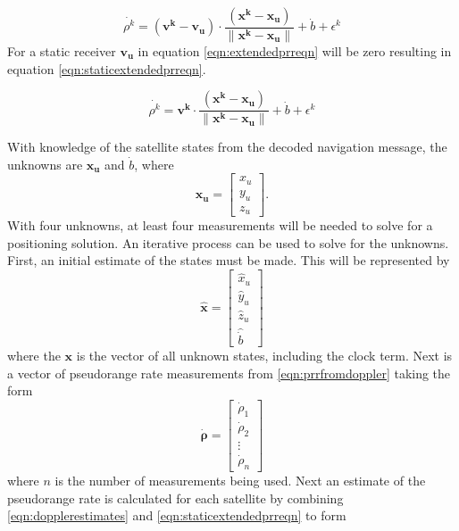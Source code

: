 \documentclass[12pt]{report}
\begin{document}
\begin{equation}
    \dot{\rho^{k}} = (\mathbf{v^{k}} - \mathbf{v_u}) \cdot \frac{(\mathbf{x^k} - \mathbf{x_u})}{\| \mathbf{x^k} - \mathbf{x_u}\|} + \dot{b} + \epsilon^{k}
    \label{eqn:extendedprreqn}
\end{equation}
For a static receiver $\mathbf{v_u}$ in equation \ref{eqn:extendedprreqn} will be zero resulting in equation \ref{eqn:staticextendedprreqn}.

\begin{equation}
    \dot{\rho^{k}} = \mathbf{v^{k}} \cdot \frac{(\mathbf{x^k} - \mathbf{x_u})}{\| \mathbf{x^k} - \mathbf{x_u}\|} + \dot{b} + \epsilon^{k}
    \label{eqn:staticextendedprreqn}
\end{equation}

With knowledge of the satellite states from the decoded navigation message, the unknowns are $\mathbf{x_u}$ and $\dot{b}$, where
\begin{equation}
\mathbf{x_u} = 
\begin{bmatrix}
        x_u\\
        y_u\\
        z_u 
\end{bmatrix}.
\end{equation}
With four unknowns, at least four measurements will be needed to solve for a positioning solution. An iterative process can be used to solve for the unknowns. 
First, an initial estimate of the states must be made. This will be represented by
\begin{equation}
    \mathbf{\hat{x}} = 
    \begin{bmatrix}
        \hat{x}_u\\
        \hat{y}_u\\
        \hat{z}_u\\
        \hat{\dot{b}}
    \end{bmatrix}
    \label{eqn:dopplerestimates}
\end{equation}
where the $\mathbf{x}$ is the vector of all unknown states, including the clock term.
Next is a vector of pseudorange rate measurements from \ref{eqn:prrfromdoppler} taking the form
\begin{equation}
\mathbf{\dot{\rho}} = \begin{bmatrix}
    \dot{\rho}_1 \\
    \dot{\rho}_2 \\
    \vdots\\
    \dot{\rho}_n
\end{bmatrix}
\end{equation}
where $n$ is the number of measurements being used. Next an estimate of the pseudorange rate is calculated for each satellite by combining \ref{eqn:dopplerestimates} and \ref{eqn:staticextendedprreqn} to form 
\end{document}
